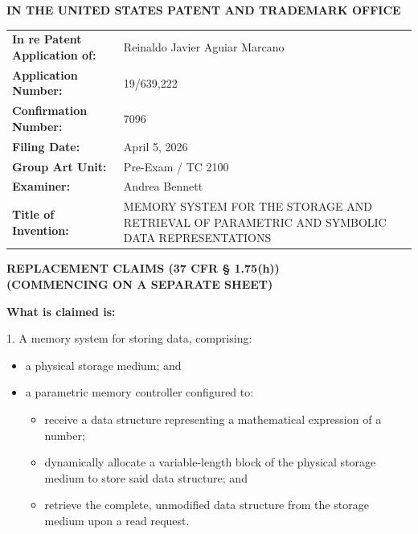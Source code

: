 \documentclass[11pt,letterpaper]{article}
\begin{document}
\thispagestyle{empty}

\begin{center}
    \large\textbf{IN THE UNITED STATES PATENT AND TRADEMARK OFFICE} \\
\end{center}

\vspace{0.3cm}
\noindent\begin{tabular}{p{2.3in}p{4.0in}}
\textbf{In re Patent Application of:} & Reinaldo Javier Aguiar Marcano \\
\textbf{Application Number:} & 19/639,222 \\
\textbf{Confirmation Number:} & 7096 \\
\textbf{Filing Date:} & April 5, 2026 \\
\textbf{Group Art Unit:} & Pre-Exam / TC 2100 \\
\textbf{Examiner:} & Andrea Bennett \\
\textbf{Title of Invention:} & MEMORY SYSTEM FOR THE STORAGE AND RETRIEVAL OF PARAMETRIC AND SYMBOLIC DATA REPRESENTATIONS \\
\end{tabular}

\vspace{0.8cm}
\begin{center}
    \textbf{\large REPLACEMENT CLAIMS (37 CFR \S{} 1.75(h))} \\
    \textbf{(COMMENCING ON A SEPARATE SHEET)}
\end{center}

\vspace{0.5cm}

\textbf{What is claimed is:}

1. A memory system for storing data, comprising:
\begin{itemize}[leftmargin=2.5em]
    \item[] a physical storage medium; and
    \item[] a parametric memory controller configured to:
    \begin{itemize}[leftmargin=2.5em]
        \item[--] receive a data structure representing a mathematical expression of a number;
        \item[--] dynamically allocate a variable-length block of the physical storage medium to store said data structure; and
        \item[--] retrieve the complete, unmodified data structure from the storage medium upon a read request.
    \end{itemize}
\end{itemize}
\end{document}
